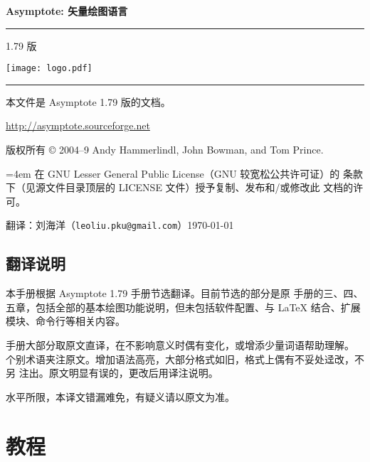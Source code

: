 \documentclass[nofonts,CJKnormalspaces]{ctexbook}[2009/05/20]
\newcommand*\prgname[1]{\textsf{#1}}
\newcommand\asyversion{1.79}
\begin{document}
\frontmatter

\begin{titlepage}
\setlength{\parindent}{0pt}
{\Huge\bfseries\prgname{Asymptote}: 矢量绘图语言}

\rule[0pt]{\textwidth}{4pt}

\hfill\asyversion{} 版

\centerline{\texttt{[image: logo.pdf]}}

\rule[0pt]{\textwidth}{2pt}

本文件是 \prgname{Asymptote} \asyversion{} 版的文档。

\url{http://asymptote.sourceforge.net}

版权所有 \copyright{} 2004--9 Andy Hammerlindl, John Bowman, and Tom Prince.

{\leftskip=4em 在 GNU Lesser General Public License（GNU 较宽松公共许可证）的
条款下（见源文件目录顶层的 \prgname{LICENSE} 文件）授予复制、发布和/或修改此
文档的许可。\par}

翻译：刘海洋（\nolinkurl{leoliu.pku@gmail.com}）\qquad\today
\end{titlepage}

\section*{翻译说明}

本手册根据 \prgname{Asymptote \asyversion} 手册节选翻译。目前节选的部分是原
手册的三、四、五章，包括全部的基本绘图功能说明，但未包括软件配置、与 \LaTeX{}
结合、扩展模块、命令行等相关内容。

手册大部分取原文直译，在不影响意义时偶有变化，或增添少量词语帮助理解。
个别术语夹注原文。增加语法高亮，大部分格式如旧，格式上偶有不妥处迳改，不另
注出。原文明显有误的，更改后用译注说明。

水平所限，本译文错漏难免，有疑义请以原文为准。


\tableofcontents

\mainmatter
\setcounter{chapter}{2}

\chapter{教程}
\label{chap:tutorial}
\end{document}
